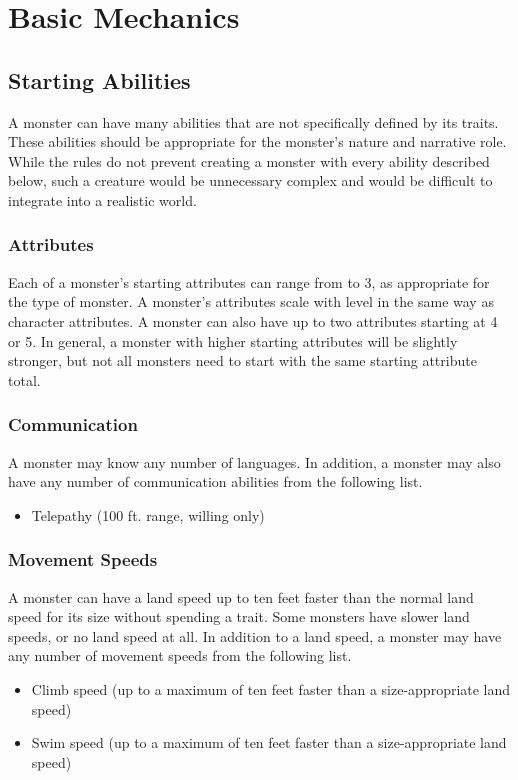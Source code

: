 \chapter{Basic Mechanics}

\section{Starting Abilities}

    A monster can have many abilities that are not specifically defined by its traits.
    These abilities should be appropriate for the monster's nature and narrative role.
    While the rules do not prevent creating a monster with every ability described below, such a creature would be unnecessary complex and would be difficult to integrate into a realistic world.

    \subsection{Attributes}
        Each of a monster's starting attributes can range from  to 3, as appropriate for the type of monster.
        A monster's attributes scale with level in the same way as character attributes.
        A monster can also have up to two attributes starting at 4 or 5.
        In general, a monster with higher starting attributes will be slightly stronger, but not all monsters need to start with the same starting attribute total.

    \subsection{Communication}
        A monster may know any number of languages.
        In addition, a monster may also have any number of communication abilities from the following list.
        \begin{itemize}
            \item Telepathy (100 ft. range, willing only)
        \end{itemize}

    \subsection{Movement Speeds}
        A monster can have a land speed up to ten feet faster than the normal land speed for its size without spending a trait.
        Some monsters have slower land speeds, or no land speed at all.
        In addition to a land speed, a monster may have any number of movement speeds from the following list.
        \begin{itemize}
            \item Climb speed (up to a maximum of ten feet faster than a size-appropriate land speed)
            \item Swim speed (up to a maximum of ten feet faster than a size-appropriate land speed)
        \end{itemize}

